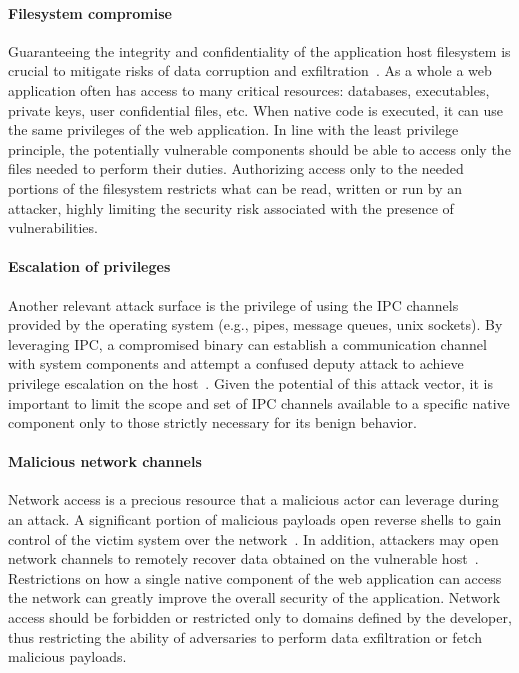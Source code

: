 \paragraph{{Filesystem compromise}}
Guaranteeing the integrity and confidentiality of the application host
filesystem is crucial to mitigate risks of data corruption and
exfiltration~\cite{berman1995tron}. As a whole a web application often has access
to many critical resources: databases, executables, private keys, user
confidential files, etc. When native code is executed, it can use the
same privileges of the web application.  In line with the
least privilege principle, the potentially vulnerable components
should be able to access only the files needed to perform their
duties.  Authorizing access only to the needed portions of the
filesystem restricts what can be read, written or run by an attacker,
highly limiting the security risk associated with the presence of
vulnerabilities.

\paragraph{Escalation of privileges}
Another relevant attack surface is the privilege of using the IPC
channels provided by the operating system (e.g., pipes, message
queues, unix sockets). By leveraging IPC, a compromised binary can
establish a communication channel with system components and attempt a
confused deputy attack to achieve privilege escalation on the
host~\cite{shao2016misuse, bui2018man}.  Given the potential of this
attack vector, it is important to limit the scope and set of IPC
channels available to a specific native component only to those strictly
necessary for its benign behavior.

\paragraph{{Malicious network channels}}
Network access is a precious resource that a malicious actor can
leverage during an attack. A significant portion of malicious payloads
open reverse shells to gain control of the victim system over the
network~\cite{bulekov2021saphire}.  In addition, attackers may open
network channels to remotely recover data obtained on the vulnerable
host~\cite{schwarz2020seng}. Restrictions on how a single native component of the
web application can access the network can greatly improve the overall
security of the application. Network access should be forbidden or
restricted only to domains defined by the developer, thus restricting
the ability of adversaries to perform data exfiltration or fetch
malicious payloads.

